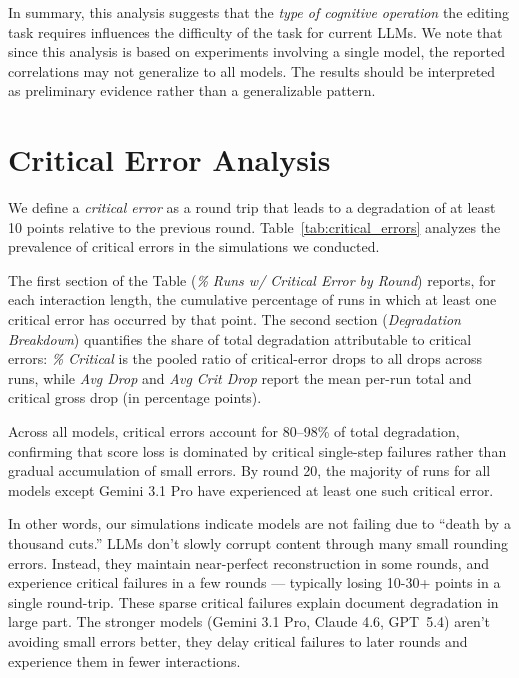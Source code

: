 \documentclass{article} %
\begin{document}
In summary, this analysis suggests that the \textit{type of cognitive operation} the editing task requires influences the difficulty of the task for current LLMs. We note that since this analysis is based on experiments involving a single model, the reported correlations may not generalize to all models. The results should be interpreted as preliminary evidence rather than a generalizable pattern.


\section{Critical Error Analysis} \label{app:critical_errors}

\begin{table}[h]
    
    \caption{Critical error analysis (10+ drop within single round). \textit{Left:} cumulative \% of runs with at least one critical error after N interactions. \textit{Right:} share of total degradation from critical errors and average per-run drop magnitudes. Models sorted by round-20 critical error rate (ascending).}
    \label{tab:critical_errors}
\end{table}

We define a \textit{critical error} as a round trip that leads to a degradation of at least 10 points relative to the previous round. Table~\ref{tab:critical_errors} analyzes the prevalence of critical errors in the simulations we conducted.

The first section of the Table (\textit{\% Runs w/ Critical Error by Round}) reports, for each interaction length, the cumulative percentage of runs in which at least one critical error has occurred by that point. The second section (\textit{Degradation Breakdown}) quantifies the share of total degradation attributable to critical errors: \textit{\% Critical} is the pooled ratio of critical-error drops to all drops across runs, while \textit{Avg Drop} and \textit{Avg Crit Drop} report the mean per-run total and critical gross drop (in percentage points).

Across all models, critical errors account for 80--98\% of total degradation, confirming that score loss is dominated by critical single-step failures rather than gradual accumulation of small errors. By round 20, the majority of runs for all models except Gemini 3.1 Pro have experienced at least one such critical error.

In other words, our simulations indicate models are not failing due to ``death by a thousand cuts.'' LLMs don't slowly corrupt content through many small rounding errors. Instead, they maintain near-perfect reconstruction in some rounds, and experience critical failures in a few rounds — typically losing 10-30+ points in a single round-trip. These sparse critical failures explain document degradation in large part. The stronger models (Gemini 3.1 Pro, Claude 4.6, GPT~5.4) aren't avoiding small errors better, they delay critical failures to later rounds and experience them in fewer interactions.
\end{document}
